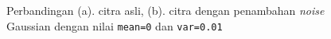 \begin{figure}[h!]
\begin{center}
\caption{Perbandingan (a). citra asli, (b). citra dengan penambahan \textit{noise} Gaussian dengan nilai \texttt{mean=0} dan \texttt{var=0.01}}
\label{fig:addNoise}
\end{center}
\end{figure}
